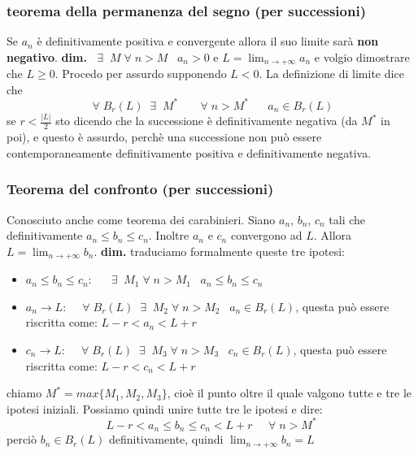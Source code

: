 \subsubsection*{teorema della permanenza del segno (per successioni)}
Se $a_n$ è definitivamente positiva e convergente allora il suo limite sarà \textbf{non negativo}.
\newline
\textbf{dim.}\newline
$\;\;\exists\;\; M \;\forall\; n > M \;\;\; a_n > 0$ e $ L = \lim_{n\rightarrow  + \infty} a_n$ e volgio dimostrare che $L \geq 0$.\newline
Procedo per assurdo supponendo $L < 0$.\newline
La definizione di limite dice che 
\[
    \;\forall\; B_r(L) \;\;\exists\;\; M^* \;\;\;\;\;\; \;\forall\; n> M^* \;\;\;\;\;\; a_n \in B_r(L)
\]
se $r< \frac{|L|}{2}$ sto dicendo che la successione è definitivamente negativa (da $M^*$ in poi), e questo è assurdo, perchè una successione non può essere contemporaneamente definitivamente positiva e definitivamente negativa.
\subsubsection*{Teorema del confronto (per successioni)}
Conosciuto anche come teorema dei carabinieri. \newline
Siano $a_n$, $b_n$, $c_n$ tali che definitivamente $a_n \leq b_n \leq c_n$. Inoltre $a_n$ e $c_n$ convergono ad $L$. Allora $L= \lim_{n\rightarrow +\infty}b_n$.\newline
\textbf{dim.} traduciamo formalmente queste tre ipotesi:
\begin{itemize}
    \item $a_n \leq b_n \leq c_n$: $\;\;\;\;\;\exists\;\;M_1 \;\forall\;n > M_1 \;\;\; a_n \leq b_n \leq c_n$
    \item $a_n \rightarrow L$: $ \;\;\;\;\forall\;B_r(L) \;\;\exists\;\; M_2 \;\forall\;n >M_2 \;\;\; a_n \in B_r(L)$, questa può essere riscritta come: $L-r < a_n < L+r$
    \item $c_n \rightarrow L$: $ \;\;\;\;\forall\;B_r(L) \;\;\exists\;\; M_3 \;\forall\;n >M_3 \;\;\; c_n \in B_r(L)$, questa può essere riscritta come: $L-r < c_n < L+r$
\end{itemize}
chiamo $M^* = max\{M_1, M_2, M_3\}$, cioè il punto oltre il quale valgono tutte e tre le ipotesi iniziali. \newline
Possiamo quindi unire tutte tre le ipotesi e dire:
\[
    L-r < a_n \leq b_n \leq c_n < L +r \;\;\;\; \;\forall\;n > M^*
\]
perciò $b_n \in B_r(L)$ definitivamente, quindi $\lim_{n\rightarrow + \infty} b_n = L$
\newpage